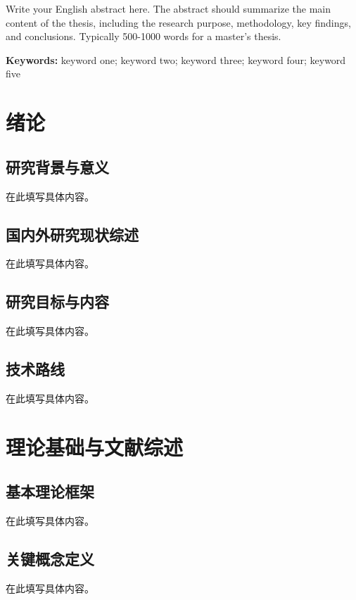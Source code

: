 \documentclass[a4paper,12pt,openright]{ctexrep}
\begin{document}
Write your English abstract here. The abstract should summarize the main content of the thesis, including the research purpose, methodology, key findings, and conclusions. Typically 500-1000 words for a master's thesis.

\vspace{1cm}
\noindent\textbf{Keywords:} keyword one; keyword two; keyword three; keyword four; keyword five

\newpage
\tableofcontents


\newpage


\chapter{绪论}
\section{研究背景与意义}
在此填写具体内容。

\section{国内外研究现状综述}
在此填写具体内容。

\section{研究目标与内容}
在此填写具体内容。

\section{技术路线}
在此填写具体内容。


\chapter{理论基础与文献综述}
\section{基本理论框架}
在此填写具体内容。

\section{关键概念定义}
在此填写具体内容。
\end{document}
